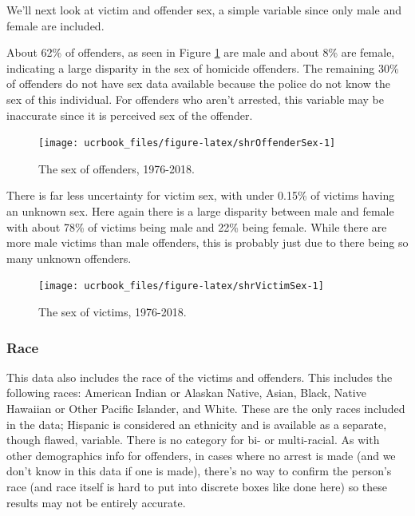 \documentclass[
  12pt,
  openany]{book}
\begin{document}
We'll next look at victim and offender sex, a simple variable since only male and female are included.

About 62\% of offenders, as seen in Figure \ref{fig:shrOffenderSex} are male and about 8\% are female, indicating a large disparity in the sex of homicide offenders. The remaining 30\% of offenders do not have sex data available because the police do not know the sex of this individual. For offenders who aren't arrested, this variable may be inaccurate since it is perceived sex of the offender.

\begin{figure}

{\centering \texttt{[image: ucrbook\_files/figure-latex/shrOffenderSex-1]} 

}

\caption{The sex of offenders, 1976-2018.}\label{fig:shrOffenderSex}
\end{figure}

There is far less uncertainty for victim sex, with under 0.15\% of victims having an unknown sex. Here again there is a large disparity between male and female with about 78\% of victims being male and 22\% being female. While there are more male victims than male offenders, this is probably just due to there being so many unknown offenders.

\begin{figure}

{\centering \texttt{[image: ucrbook\_files/figure-latex/shrVictimSex-1]} 

}

\caption{The sex of victims, 1976-2018.}\label{fig:shrVictimSex}
\end{figure}

\hypertarget{race-1}{%
\subsubsection{Race}\label{race-1}}

This data also includes the race of the victims and offenders. This includes the following races: American Indian or Alaskan Native, Asian, Black, Native Hawaiian or Other Pacific Islander, and White. These are the only races included in the data; Hispanic is considered an ethnicity and is available as a separate, though flawed, variable. There is no category for bi- or multi-racial. As with other demographics info for offenders, in cases where no arrest is made (and we don't know in this data if one is made), there's no way to confirm the person's race (and race itself is hard to put into discrete boxes like done here) so these results may not be entirely accurate.
\end{document}
